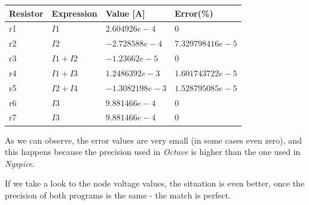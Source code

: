 \begin{table}
\centering
\begin{tabularx}{0.8\textwidth} {
  | >{\raggedright\arraybackslash}X
  | >{\centering\arraybackslash}X
  | >{\centering\arraybackslash}X
  | >{\raggedleft\arraybackslash}X | }
 \hline
 Resistor & Expression & Value [A] & Error(\%)\\
 \hline
 r1 & $I1$ & $2.604926e-4$ & $0$ \\
 \hline
 r2 & $I2$ & $-2.728588e-4$ & $7.329798416e-5$ \\
 \hline
 r3 & $I1+I2$ & $-1.23662e-5$ & $0$ \\
 \hline
 r4 & $I1+I3$ & $1.2486392e-3$ & $1.601743722e-5$ \\
 \hline
 r5 & $I2+I4$ & $-1.3082198e-3$ & $1.528795085e-5$ \\
 \hline
 r6 & $I3$ & $9.881466e-4$ & $0$ \\
 \hline
 r7 & $I3$ & $9.881466e-4$ & $0$ \\
\hline
\end{tabularx}
\end{table}

\vspace{5mm}
\par \noindent As we can observe, the error values are very small (in some cases even zero), and this happens because the precision used in \emph{Octave} is higher than the one used in \emph{Ngspice}.
\par \noindent If we take a look to the node voltage values, the situation is even better, once the precision of both programs is the same - the match is perfect.
